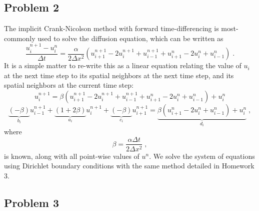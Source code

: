 \documentclass[11pt]{article}
\begin{document}
\subsection{Problem 2}

The implicit Crank-Nicolson method with forward time-differencing is most-commonly used to solve the diffusion equation, which can be written as
\begin{equation}
\frac{u_i^{n+1} - u_i^n}{\Delta t}
=
\frac{\alpha}{2 \Delta x^2}
\left(
u_{i+1}^{n+1} - 2 u_i^{n+1} + u_{i-1}^{n+1} + u_{i+1}^n - 2 u_i^n + u_{i-1}^n
\right)
\;.
\label{eq:prob2_crank}
\end{equation}
It is a simple matter to re-write this as a linear equation relating the value of $u_i$ at the next time step to its spatial neighbors at the next time step, and its spatial neighbors at the current time step:
\begin{equation}
u_i^{n+1}
=
\beta
\left(
u_{i+1}^{n+1} - 2 u_i^{n+1} + u_{i-1}^{n+1} + u_{i+1}^n - 2 u_i^n + u_{i-1}^n
\right)
+ u_i^n
\end{equation}
\begin{equation}
  \underbrace{\left(      -\beta \right)}_{b_i} u_{i-1}^{n+1}
+ \underbrace{\left( 1 + 2 \beta \right)}_{a_i} u_i^{n+1}
+ \underbrace{\left(      -\beta \right)}_{c_i} u_{i+1}^{n+1}
=
\underbrace{\beta \left( u_{i+1}^n - 2 u_i^n + u_{i-1}^n \right) + u_i^n}_{d_i}
\;,
\label{eq:matrix_terms}
\end{equation}
where
\begin{equation}
\beta = \frac{\alpha \Delta t}{2 \Delta x^2}
\;,
\end{equation}
is known, along with all point-wise values of $u^n$. We solve the system of equations using Dirichlet boundary conditions with the same method detailed in Homework 3.

\subsection{Problem 3}
\end{document}
